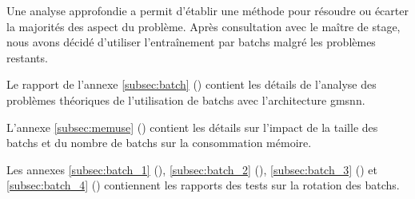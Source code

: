 Une analyse approfondie a permit d'établir une méthode pour résoudre ou écarter la majorités des aspect du problème. Après consultation avec le maître de stage, nous avons décidé d'utiliser l'entraînement par \glspl{batch} malgré les problèmes restants.

Le rapport de l'annexe \ref{subsec:batch} () contient les détails de l'analyse des problèmes théoriques de l'utilisation de \glspl{batch} avec l'architecture \gls{gmsnn}.

L'annexe \ref{subsec:memuse} () contient les détails sur l'impact de la taille des \glspl{batch} et du nombre de \glspl{batch} sur la consommation mémoire.

Les annexes \ref{subsec:batch_1} (), \ref{subsec:batch_2} (), \ref{subsec:batch_3} () et \ref{subsec:batch_4} () contiennent les rapports des tests sur la rotation des \glspl{batch}.